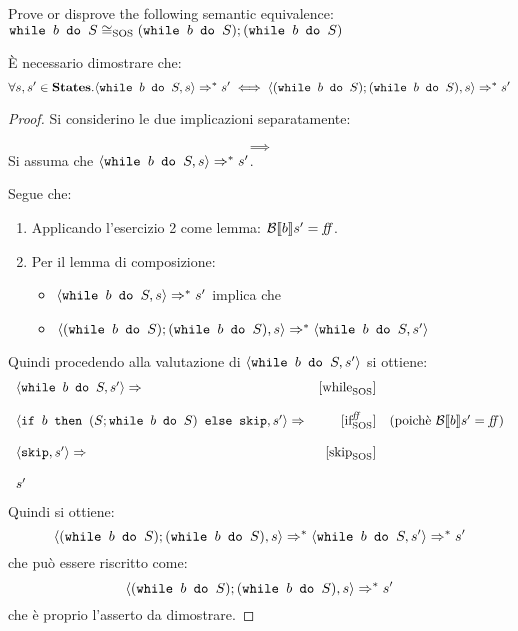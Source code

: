 {Prove or disprove the following semantic equivalence: \vspace{.7em} \\
$\wbS{b}{S} \eqSOS (\wbS{b}{S}); (\wbS{b}{S})$
}
{




È necessario dimostrare che:
$$
\forall s,s' \in \states.
	\confSs{\wbS{b}{S}}{s} \Rar{*} s'
	\iff
	\confSs{(\wbS{b}{S}); (\wbS{b}{S})}{s} \Rar{*} s'
$$
\begin{proof} Si considerino le due implicazioni separatamente:

\vspace{10pt}
$$
\boxed{\implies}
$$
Si assuma che $\confSs{\wbS{b}{S}}{s} \Rar{*} s'$.

Segue che:
\begin{enumerate}
 \item Applicando l'esercizio 2 come lemma: $\B{b}' = \semfalse$. 
 \item Per il lemma di composizione: 
   \begin{itemize}
      \item $\confSs{\wbS{b}{S}}{s} \Rar{*} s'$ implica che
      \item $\confSs{(\wbS{b}{S}); (\wbS{b}{S})}{s} \Rar{*} \confSs{\wbS{b}{S}}{s'}$
   \end{itemize}
\end{enumerate}
Quindi procedendo alla valutazione di $\confSs{\wbS{b}{S}}{s'}$ si ottiene:
$$
\begin{array}{lrr}
\confSs{\wbS{b}{S}}{s'} \Rar{} & \whileSOS & \\
& &\\
\confSs{\ifABC{b}{(S; \wbS{b}{S})}{\skipForFriends}}{s'} \Rar{} & \ifffSOS & 
(\text{poichè }\B{b}' = \semfalse)\\
& &\\
\confSs{\skipForFriends}{s'} \Rar{} & \skipSOS\\
& &\\
s' &\\
\end{array}
$$
Quindi si ottiene:
$$
\confSs{(\wbS{b}{S}); (\wbS{b}{S})}{s} \Rar{*} \confSs{\wbS{b}{S}}{s'} \Rar{*} s'
$$
che può essere riscritto come:
$$\confSs{(\wbS{b}{S}); (\wbS{b}{S})}{s} \Rar{*} s'$$
che è proprio l'asserto da dimostrare.
\vspace{10pt}



\end{proof}}
